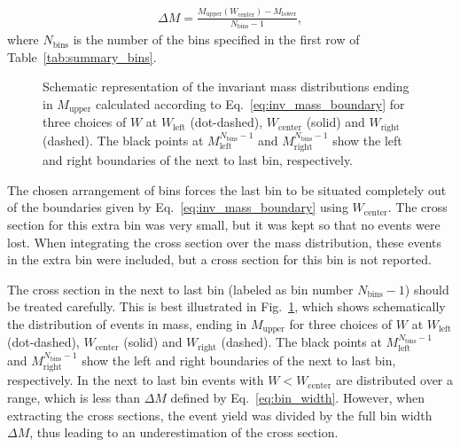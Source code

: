 \documentclass[prc,twocolumn,superscriptaddress,showpacs,amssymb,amsmath,amsfonts,aps,nofootinbib]{revtex4-1}
\begin{document}
\begin{equation}
\begin{aligned}
\Delta M = \frac{M_{\text{upper}}(W_{\text{center}})-M_{\text{lower}}}{N_{\text{bins}}-1}, \label{eq:bin_width}
\end{aligned}  
\end{equation} 
where $N_{\text{bins}}$ is the number of the bins specified in the first row of Table~\ref{tab:summary_bins}. 






\begin{figure}[htp]
\begin{center}
\caption{\small Schematic representation of the invariant mass distributions ending in 
 $M_{\text{upper}}$ calculated according to Eq.~\eqref{eq:inv_mass_boundary} for three 
choices of $W$ at $W_{\text{left}}$ (dot-dashed), $W_{\text{center}}$ (solid) and 
$W_{\text{right}}$ (dashed).
The black points at $M_{\text{left}}^{N_{\text{bins}}-1}$ and $M_{\text{right}}^{N_{\text{bins}}-1}$ show the left and right boundaries of the next to last bin, respectively.
\label{fig:mass_corr}}
\end{center}
\end{figure}

The chosen arrangement of bins forces the last bin to be situated completely out of the boundaries given by Eq.~\eqref{eq:inv_mass_boundary} using $W_{\text{center}}$. The cross section 
for this extra bin was very small, but it was kept so that no 
events were lost. When integrating the cross section over the 
mass distribution, these events in the extra bin were included, 
but a cross section for this bin is not reported.
 

The cross section in the next to last bin (labeled as bin number 
$N_{\text{bins}}-1$) should be treated carefully. This is best illustrated in Fig.~\ref{fig:mass_corr}, which shows schematically the 
distribution of events in mass, ending in $M_{\text{upper}}$ for three 
choices of $W$ at $W_{\text{left}}$ (dot-dashed), $W_{\text{center}}$ (solid) and 
$W_{\text{right}}$ (dashed).
The black points at $M_{\text{left}}^{N_{\text{bins}}-1}$ and $M_{\text{right}}^{N_{\text{bins}}-1}$ show the left and right boundaries of the next to last bin, respectively. In the next to last bin events with $W < W_{\text{center}}$ are 
distributed over a range, which is less than $\Delta M$ defined by Eq.~\eqref{eq:bin_width}.
However, when extracting the cross sections, the event yield was divided by the full bin width $\Delta M$, thus leading to an underestimation of the cross section.
\end{document}
